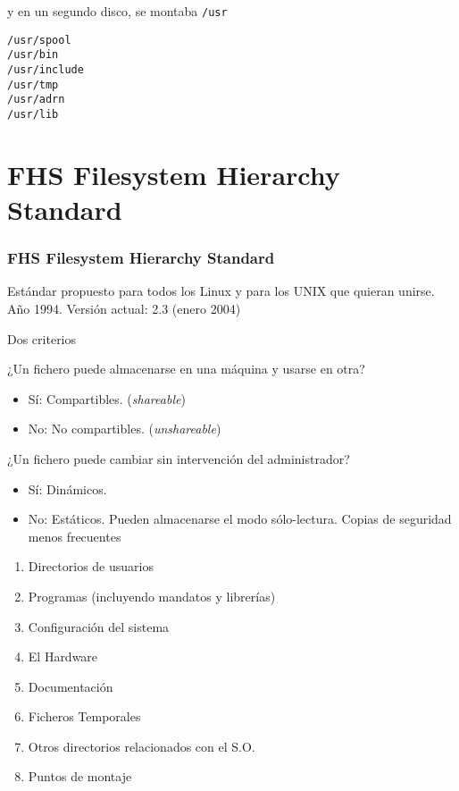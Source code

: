 \documentclass[ucs]{beamer}
\begin{document}

\begin{frame}[fragile]

y en un segundo disco, se montaba \verb|/usr|
\begin{verbatim}
/usr/spool
/usr/bin
/usr/include
/usr/tmp
/usr/adrn
/usr/lib
\end{verbatim}
\end{frame}


\section{FHS Filesystem Hierarchy Standard}

\begin{frame}[fragile]
\frametitle{FHS Filesystem Hierarchy Standard}
Estándar propuesto para todos los Linux y para los UNIX que
quieran unirse. Año 1994.  Versión actual: 2.3 (enero 2004)

Dos criterios

¿Un fichero puede almacenarse en una máquina y usarse en otra?
\begin{itemize}	
\item
Sí: Compartibles. (\emph{shareable}) 
\item 
No: No compartibles. (\emph{unshareable})
\end{itemize}

¿Un fichero puede cambiar sin intervención del administrador?

\begin{itemize}	
\item 
Sí: Dinámicos. 
\item 
No: Estáticos. Pueden almacenarse el modo sólo-lectura. Copias
de seguridad menos frecuentes
\end{itemize}

\end{frame}




\begin{frame}[fragile]

\begin{enumerate}
\item Directorios de usuarios
\item Programas (incluyendo mandatos y librerías)
\item Configuración del sistema        
\item El Hardware
\item Documentación
\item Ficheros Temporales
\item Otros directorios relacionados con el S.O.
\item Puntos de montaje
\end{enumerate}

\end{frame}
\end{document}
